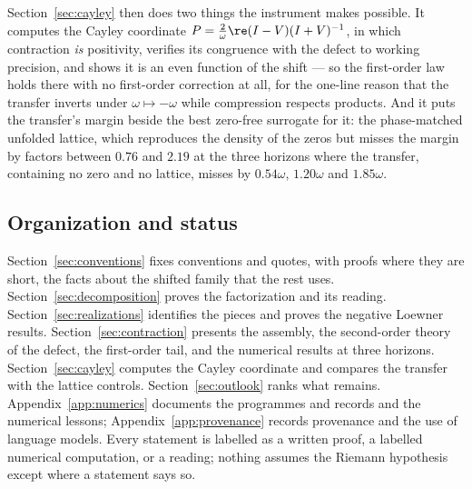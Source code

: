 Section~\ref{sec:cayley} then does two things the instrument makes possible.
It computes the Cayley coordinate $P=\frac2\omega\re(I-V)(I+V)^{-1}$, in which
contraction \emph{is} positivity, verifies its congruence with the defect to
working precision, and shows it is an even function of the shift --- so the
first-order law holds there with no first-order correction at all, for the
one-line reason that the transfer inverts under $\omega\mapsto-\omega$ while
compression respects products. And it puts the transfer's margin beside the best
zero-free surrogate for it: the phase-matched unfolded lattice, which reproduces
the density of the zeros but misses the margin by factors between $0.76$ and
$2.19$ at the three horizons where the transfer, containing no zero and no
lattice, misses by $0.54\omega$, $1.20\omega$ and $1.85\omega$.

\subsection{Organization and status}

Section~\ref{sec:conventions} fixes conventions and quotes, with proofs where
they are short, the facts about the shifted family that the rest uses.
Section~\ref{sec:decomposition} proves the factorization and its reading.
Section~\ref{sec:realizations} identifies the pieces and proves the negative
Loewner results. Section~\ref{sec:contraction} presents the assembly, the
second-order theory of the defect, the first-order tail, and the numerical
results at three horizons. Section~\ref{sec:cayley} computes the Cayley
coordinate and compares the transfer with the lattice controls.
Section~\ref{sec:outlook} ranks what remains. Appendix~\ref{app:numerics}
documents the programmes and records and the numerical lessons;
Appendix~\ref{app:provenance} records provenance and the use of language
models. Every statement is labelled as a written proof, a labelled numerical
computation, or a reading; nothing assumes the Riemann hypothesis except where
a statement says so.
